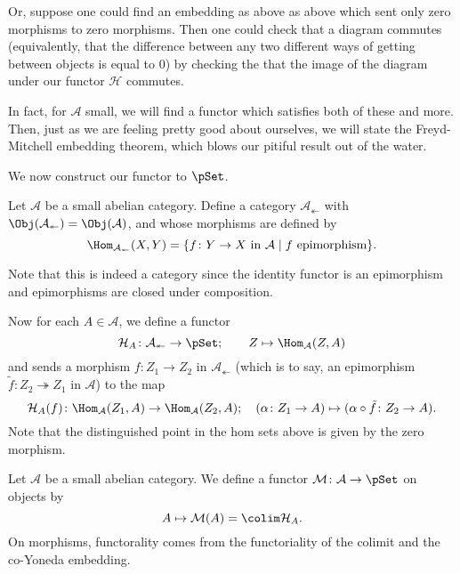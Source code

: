 \documentclass[main.tex]{subfiles}
\begin{document}
Or, suppose one could find an embedding as above as above which sent only zero morphisms to zero morphisms. Then one could check that a diagram commutes (equivalently, that the difference between any two different ways of getting between objects is equal to $0$) by checking the that the image of the diagram under our functor $\mathcal{H}$ commutes.

In fact, for $\mathcal{A}$ small, we will find a functor which satisfies both of these and more. Then, just as we are feeling pretty good about ourselves, we will state the Freyd-Mitchell embedding theorem, which blows our pitiful result out of the water.

We now construct our functor to $\pSet$.

\begin{definition}
  \label{def:category_of_contravariant_epimorphisms}
  Let $\mathcal{A}$ be a small abelian category. Define a category $\mathcal{A}_{\twoheadleftarrow}$ with $\Obj(\mathcal{A}_{\twoheadleftarrow}) = \Obj(\mathcal{A})$, and whose morphisms are defined by
  \begin{equation*}
    \Hom_{\mathcal{A}_{\twoheadleftarrow}}(X, Y) = \{f\colon Y \to X \text{ in }\mathcal{A}\mid f \text{ epimorphism}\}.
  \end{equation*}
\end{definition}

Note that this is indeed a category since the identity functor is an epimorphism and epimorphisms are closed under composition.

Now for each $A \in \mathcal{A}$, we define a functor
\begin{equation*}
  \mathcal{H}_{A}\colon \mathcal{A}_{\twoheadleftarrow} \to \pSet;\qquad Z \mapsto \Hom_{\mathcal{A}}(Z, A)
\end{equation*}
and sends a morphism $f\colon Z_{1} \to Z_{2}$ in $\mathcal{A}_{\twoheadleftarrow}$ (which is to say, an epimorphism $\tilde{f}\colon Z_{2} \twoheadrightarrow Z_{1}$ in $\mathcal{A}$) to the map
\begin{equation*}
  \mathcal{H}_{A}(f)\colon \Hom_{\mathcal{A}}(Z_{1}, A) \to \Hom_{\mathcal{A}}(Z_{2}, A);\quad (\alpha\colon Z_{1} \to A) \mapsto (\alpha \circ \tilde{f}\colon Z_{2} \to A).
\end{equation*}
Note that the distinguished point in the hom sets above is given by the zero morphism.

\begin{definition}
  \label{def:member_functor}
  Let $\mathcal{A}$ be a small abelian category. We define a functor $\mathcal{M}\colon \mathcal{A} \to \pSet$ on objects by
  \begin{equation*}
    A \mapsto \mathcal{M}(A) = \colim \mathcal{H}_{A}.
  \end{equation*}
  On morphisms, functorality comes from the functoriality of the colimit and the co-Yoneda embedding.
\end{definition}
\end{document}
